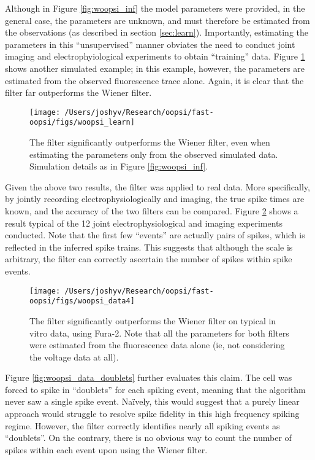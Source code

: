 Although in Figure \ref{fig:woopsi_inf} the model parameters were provided, in the general case, the parameters are unknown, and must therefore be estimated from the observations (as described in section \ref{sec:learn}). Importantly, estimating the parameters in this ``unsupervised'' manner obviates the need to conduct joint imaging and electrophyiological experiments to obtain ``training'' data.  Figure \ref{fig:woopsi_learn} shows another simulated example; in this example, however, the parameters are estimated from the observed fluorescence trace alone.  Again, it is clear that the \foopsi filter far outperforms the Wiener filter.

\begin{figure}[h!]
\centering \texttt{[image: /Users/joshyv/Research/oopsi/fast-oopsi/figs/woopsi\_learn]}
\caption[parameters may be estimated using the \foopsi filter]{The \foopsi filter significantly outperforms the Wiener filter, even when estimating the parameters only from the observed simulated data.  Simulation details as in Figure \ref{fig:woopsi_inf}.} \label{fig:woopsi_learn}
\end{figure}

Given the above two results, the \foopsi filter was applied to real data.  More specifically, by jointly recording electrophysiologically and imaging, the true spike times are known, and the accuracy of the two filters can be compared.  Figure \ref{fig:woopsi_data} shows a result typical of the 12 joint electrophysiological and imaging experiments conducted. Note that the first few ``events'' are actually pairs of spikes, which is reflected in the inferred spike trains. This suggests that although the scale is arbitrary, the \foopsi filter can correctly ascertain the number of spikes within spike events.  

\begin{figure}[h!]
\centering \texttt{[image: /Users/joshyv/Research/oopsi/fast-oopsi/figs/woopsi\_data4]}
\caption[\foopsi filter outperforms Wiener filter on real data]{The \foopsi filter significantly outperforms the Wiener filter on typical in vitro data, using Fura-2.  Note that all the parameters for both filters were estimated from the fluorescence data alone (ie, not considering the voltage data at all).} \label{fig:woopsi_data}
\end{figure}

Figure \ref{fig:woopsi_data_doublets} further evaluates this claim.  The cell was forced to spike in ``doublets'' for each spiking event, meaning that the algorithm never saw a single spike event.  Na\"{i}vely, this would suggest that a purely linear approach would struggle to resolve spike fidelity in this high frequency spiking regime.  However, the \foopsi filter correctly identifies nearly all spiking events as ``doublets''.  On the contrary, there is no obvious way to count the number of spikes within each event upon using the Wiener filter.


